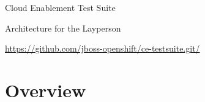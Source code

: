 \documentclass{article}
\begin{document}
\newcommand{\pods}[5]{
  \xdef\id{#1}
  \pgfmathtruncatemacro{\numPods}{#2-1}
  \xdef\numCons{#3-1};
  \pgfmathtruncatemacro{\cpp}{2 - 1} %
  \xdef\cfit{} %
  \xdef\pfit{} %
  
  \node[#4] (BASE) {};
  \xdef\lcp{BASE}; %
  \xdef\sbc{}; %
  \pgfmathsetmacro\r{#3}
        
  \foreach \x in {0,...,\numPods}{
    \pgfmathsetmacro\pods{int(#2 - \x))}
    {\ifthenelse{\r > \pods }
    { %
      \xdef\numCons{1}
      \pgfmathsetmacro\r{int(\r - 2)}
      \xdef\r{\r}
    }
    { %
      \xdef\numCons{0};
      \pgfmathsetmacro\r{int(\r - 1)}
      \xdef\r{\r}
    }
    };    

    \foreach \y in {0,...,\numCons}{
      \node[c_full, right= \sbc of \lcp] (P\x_C\y_#1) {};
      \xdef\lcp{P\x_C\y_#1} 
      \xdef\cfit{\cfit(P\x_C\y_#1)} %
      \xdef\sbc{}; %
    }
    
    \pgfmathparse{rnd}
    \pgfmathtruncatemacro{\cc}{(\id)*0.4}
    \xdefinecolor{rColor}{rgb}{\cc, 0.7, \pgfmathresult}
          
    \node[pod, fill=rColor, fit=\cfit] (P\x_\id) {};

    \xdef\cfit{};
    \xdef\sbc{0cm and 0.5cm}; %
    \xdef\pfit{\pfit(P\x_\id)} %
    }
    #5
}
      
\newcommand{\namespace}[4]{
  \pods{#1}{#2}{#3}{#4}{\node[fit=\pfit] (NS_#1) {};};
  \node[NS, fit=\pfit] (NS_#1) {};
  \node[above=0cm of NS_#1.north] (NS_#1_LABEL) {Namespace #1};
  \pods{#1}{#2}{#3}{#4}{};
}
      
\centerline{\sc \large Cloud Enablement Test Suite}
\centerline{\sc Architecture for the Layperson }
\centerline{\url{https://github.com/jboss-openshift/ce-testsuite.git/}}

\vspace{1pc}
\section{Overview}
\end{document}
